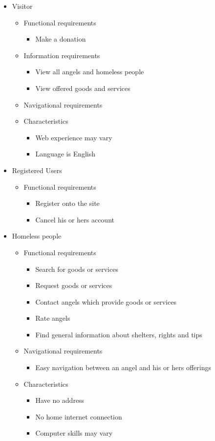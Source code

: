 \documentclass[a4paper]{report}
\begin{document}
\begin{itemize}
\item Visitor

\begin{itemize}
\item Functional requirements
\begin{itemize}
	\item Make a donation
\end{itemize}
\item Information requirements
\begin{itemize}
	\item View all angels and homeless people
	\item View offered goods and services
\end{itemize}
\item Navigational requirements
\item Characteristics
\begin{itemize}
	\item Web experience may vary
	\item Language is English
\end{itemize}
\end{itemize}


\item Registered Users
\begin{itemize}
\item Functional requirements
\begin{itemize}
	\item Register onto the site
	\item Cancel his or hers account
\end{itemize}
\end{itemize}

\item Homeless people
\begin{itemize}
\item Functional requirements
\begin{itemize}
	\item Search for goods or services
	\item Request goods or services
	\item Contact angels which provide goods or services
	\item Rate angels
	\item Find general information about shelters, rights and tips
\end{itemize}
\item Navigational requirements
\begin{itemize}
	\item Easy navigation between an angel and his or hers offerings
\end{itemize}
\item Characteristics
\begin{itemize}
	\item Have no address
	\item No home internet connection
	\item Computer skills may vary
\end{itemize}
\end{itemize}


\end{itemize}
\end{document}

